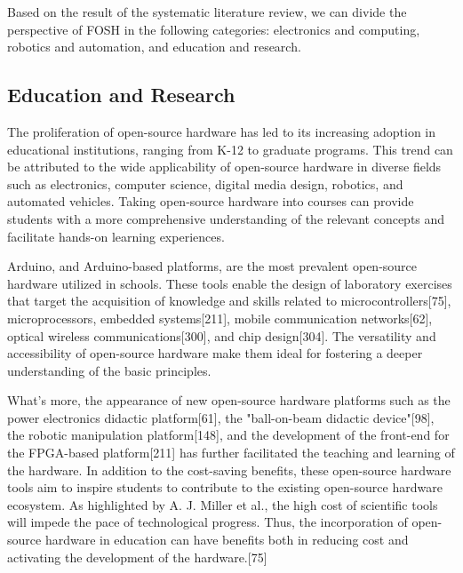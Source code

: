 \documentclass[final-report.tex]{subfiles}
\begin{document}
Based on the result of the systematic literature review, we can divide the perspective of FOSH in the following categories: electronics and computing, robotics and automation, and education and research.

\subsection{Education and Research}

The proliferation of open-source hardware has led to its increasing adoption in educational institutions, ranging from K-12 to graduate programs.\cite{martinez2017open}
This trend can be attributed to the wide applicability of open-source hardware in diverse fields such as electronics\cite{papazoglou2017openhardsim}, computer science, digital media design\cite{chen2021research}, robotics\cite{vrochidou2018open}, and automated vehicles\cite{nakamoto2019development}. 
Taking open-source hardware into courses can provide students with a more comprehensive understanding of the relevant concepts and facilitate hands-on learning experiences.\cite{chen2021research}

Arduino, and Arduino-based platforms, are the most prevalent open-source hardware utilized in schools. 
These tools enable the design of laboratory exercises that target the acquisition of knowledge and skills related to microcontrollers[75], microprocessors\cite{papazoglou2017openhardsim}, embedded systems[211], mobile communication networks[62], optical wireless communications[300], and chip design[304]. 
The versatility and accessibility of open-source hardware make them ideal for fostering a deeper understanding of the basic principles.

What's more, the appearance of new open-source hardware platforms such as the power electronics didactic platform[61], the "ball-on-beam didactic device"[98], the robotic manipulation platform[148], and the development of the front-end for the FPGA-based platform[211] has further facilitated the teaching and learning of the hardware. 
In addition to the cost-saving benefits, these open-source hardware tools aim to inspire students to contribute to the existing open-source hardware ecosystem. 
As highlighted by A. J. Miller et al., the high cost of scientific tools will impede the pace of technological progress. 
Thus, the incorporation of open-source hardware in education can have benefits both in reducing cost and activating the development of the hardware.[75]
\end{document}
